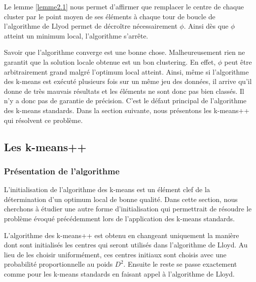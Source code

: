 \documentclass[12pt,a4paper]{book}
\newcommand{\1}{\mathds{1}}
\begin{document}
Le lemme \ref{lemme2.1} nous permet d'affirmer que remplacer le centre de chaque cluster par le point moyen de ses éléments à chaque tour de boucle de l'algorithme de Llyod permet de décroître nécessairement $\phi$. Ainsi dès que $\phi$ atteint un minimum local, l'algorithme s'arrête.

Savoir que l'algorithme converge est une bonne chose. Malheureusement rien ne garantit que la solution locale obtenue est un bon clustering. En effet, $\phi$  peut être arbitrairement grand malgré l'optimum local atteint. Ainsi, même si l'algorithme des k-means est exécuté plusieurs fois sur un même jeu des données, il arrive qu'il donne de très mauvais résultats et les éléments ne sont donc pas bien classés. Il n'y a donc pas de garantie de précision. C'est le défaut principal de l'algorithme des k-means standards. Dans la section suivante, nous présentons les k-means++ qui résolvent ce problème.


\subsection{Les k-means++}

\subsubsection{Présentation de l'algorithme}

L'initialisation de l'algorithme des k-means est un élément clef de la détermination d'un optimum local de bonne qualité. Dans cette section, nous cherchons à étudier une autre forme d'initialisation qui permettrait de résoudre le problème évoqué précédemment lors de l'application des k-means standards.

L'algorithme des k-means++ est obtenu en changeant uniquement la manière dont sont initialisés les centres qui seront utilisés dans l'algorithme de Lloyd. Au lieu de les choisir uniformément, ces centres initiaux sont choisis avec une probabilité proportionnelle au poids $D^2$. Ensuite le reste se passe exactement comme pour les k-means standards en faisant appel à l'algorithme de Lloyd. 
\end{document}

